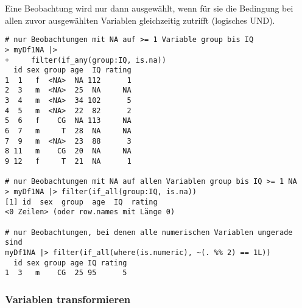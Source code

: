 Eine Beobachtung wird nur dann ausgewählt, wenn für sie die Bedingung bei allen zuvor ausgewählten Variablen gleichzeitig zutrifft (logisches UND).
\begin{lstlisting}
# nur Beobachtungen mit NA auf >= 1 Variable group bis IQ
> myDf1NA |>
+     filter(if_any(group:IQ, is.na))
  id sex group age  IQ rating
1  1   f  <NA>  NA 112      1
2  3   m  <NA>  25  NA     NA
3  4   m  <NA>  34 102      5
4  5   m  <NA>  22  82      2
5  6   f    CG  NA 113     NA
6  7   m     T  28  NA     NA
7  9   m  <NA>  23  88      3
8 11   m    CG  20  NA     NA
9 12   f     T  21  NA      1

# nur Beobachtungen mit NA auf allen Variablen group bis IQ >= 1 NA
> myDf1NA |> filter(if_all(group:IQ, is.na))
[1] id  sex  group  age  IQ  rating
<0 Zeilen> (oder row.names mit Länge 0)

# nur Beobachtungen, bei denen alle numerischen Variablen ungerade sind
myDf1NA |> filter(if_all(where(is.numeric), ~(. %% 2) == 1L))
  id sex group age IQ rating
1  3   m    CG  25 95      5
\end{lstlisting}

%

\subsubsection{Variablen transformieren}

